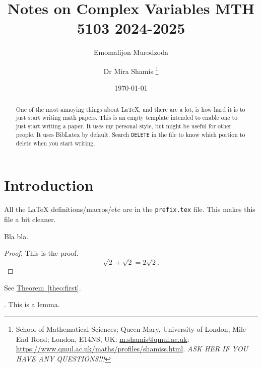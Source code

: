 \documentclass[12pt]{article}
\makeatletter
\newcommand{\HLink}[2]{\hyperref[#2]{#1~\ref*{#2}}}
\newcommand{\thmlab}[1]{{\label{theo:#1}}}
\newcommand{\thmref}[1]{\HLink{Theorem}{theo:#1}}
\newcommand{\lemlab}[1]{\label{lemma:#1}}
\newcommand{\MiraThanks}[1]{%
   \thanks{%
      School of Mathematical Sciences; %
      Queen Mary, University of London; %
      Mile End Road; %
      London, E14NS, UK; %
      \href{m.shamis@qmul.ac.uk}{m.shamis@qmul.ac.uk}; %
      \url{https://www.qmul.ac.uk/maths/profiles/shamiss.html}. %
   #1%
   }%
}
\makeatother
\begin{document}
\title{Notes on Complex Variables MTH 5103 2024-2025}

\author{%
   Emomalijon Murodzoda%
   \and%
   Dr Mira Shamis%
   \MiraThanks{\emph{ASK HER IF YOU HAVE ANY QUESTIONS!!!}}
}

\date{\today}

\maketitle

\begin{abstract}
    One of the most annoying things about \LaTeX, and there are a lot,
    is how hard it is to just start writing math papers. This is an
    empty template intended to enable one to just start writing a
    paper. It uses my personal style, but might be useful for other people. It uses BibLatex by default. Search \texttt{DELETE} in the file to know which portion to delete when you start writing.
\end{abstract}



\section{Introduction}




All the \LaTeX{} definitions/macros/etc are in the \texttt{prefix.tex} file. This makes this file a bit cleaner.


\begin{theorem}
    \thmlab{first}%
    Bla bla.
\end{theorem}
\begin{proof}
    This is the proof.
    \[
    \sqrt{2} + \sqrt{2} = 2 \sqrt{2}.
    \]
\end{proof}


See \thmref{first}.
\begin{lemma}
    \lemlab{second}.
    This is a lemma.
\end{lemma}
\end{document}

